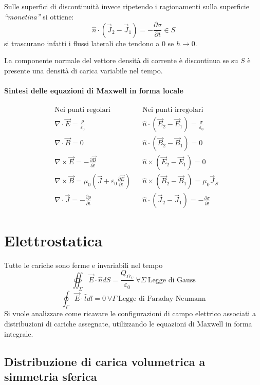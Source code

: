 Sulle superfici di discontinuità invece ripetendo i ragionamenti sulla superficie \textit{``monetina''}
si ottiene:
$$
\hat{n}\cdot\left(\vec{J}_2-\vec{J}_1\right) = -\frac{\partial\sigma}{\partial t} \in S
$$
si trascurano infatti i flussi laterali che tendono a 0 se $h\to 0$.

La componente normale del vettore densità di corrente è discontinua se su $S$ è presente una densità
di carica variabile nel tempo.

\paragraph{Sintesi delle equazioni di Maxwell in forma locale} 
\begin{align*}
&\text{Nei punti}\text{ regolari}  & &\text{Nei punti}\text{ irreg}\text{olari}\\
&\nabla\cdot\vec{E} = \frac{\rho}{\varepsilon_0} & &\hat{n}\cdot(\vec{E}_2-\vec{E}_1) = \frac{\sigma}{\varepsilon_0}\\
&\nabla\cdot\vec{B} = 0 & &\hat{n}\cdot(\vec{B}_2-\vec{B}_1) = 0\\
&\nabla\times\vec{E} = -\frac{\partial\vec{B}}{\partial t}& &\hat{n}\times(\vec{E}_2-\vec{E}_1) = 0\\
&\nabla\times\vec{B} = \mu_0\left(\vec{J} + \varepsilon_0\frac{\partial\vec{E}}{\partial t}\right)& &\hat{n}\times(\vec{B}_2-\vec{B}_1) = \mu_0\vec{J}_S \\
&\nabla\cdot\vec{J} = -\frac{\partial\rho}{\partial t} & &\hat{n}\cdot(\vec{J}_2-\vec{J}_1) = -\frac{\partial \sigma}{\partial t}
\end{align*}

\section{Elettrostatica}
Tutte le cariche sono ferme e invariabili nel tempo
$$
\oiint_\Sigma \vec{E}\cdot\hat{n}dS = \frac{Q_{\Omega_\Sigma}}{\varepsilon_0}\ \forall\Sigma\ \text{Legge di Gauss}
$$
$$
\oint_\Gamma \vec{E}\cdot\hat{t}dl = 0 \ \forall\Gamma\ \text{Legge di Faraday-Neumann}
$$
Si vuole analizzare come ricavare le configurazioni di campo elettrico associati a distribuzioni
di cariche assegnate, utilizzando le equazioni di Maxwell in forma integrale.

\subsection{Distribuzione di carica volumetrica a simmetria sferica}


